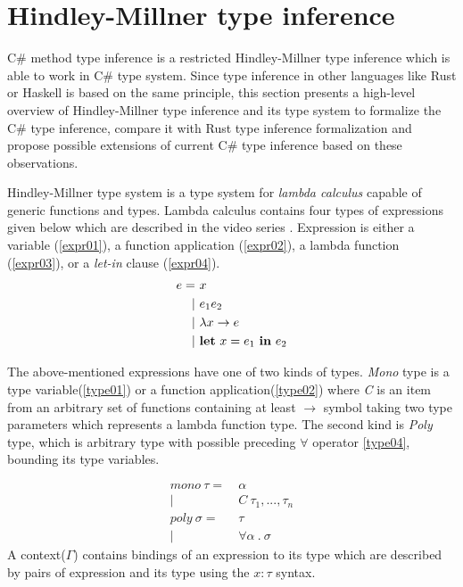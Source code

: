 \section{Hindley-Millner type inference}

C\# method type inference is a restricted Hindley-Millner type inference which is able to work in C\# type system.
Since type inference in other languages like Rust or Haskell is based on the same principle, this section presents a high-level overview of Hindley-Millner type inference and its type system to formalize the C\# type inference, compare it with Rust type inference formalization and propose possible extensions of current C\# type inference based on these observations.
\par
Hindley-Millner type system \cite{online:wikiHM} is a type system for \textit{lambda calculus} capable of generic functions and types.
Lambda calculus contains four types of expressions given below which are described in the video series \cite{online:HMVideos}.
Expression is either a variable (\ref{expr01}), a function application (\ref{expr02}), a lambda function (\ref{expr03}), or a \textit{let-in} clause (\ref{expr04}).
\begin{align}
e =&\ x\label{expr01}\\
|&\ e_1 e_2\label{expr02}\\
|&\ \lambda x \rightarrow e\label{expr03}\\
|&\ \text{\textbf{let}}\ x = e_1\ \text{\textbf{in}}\ e_2\label{expr04} 
\end{align}
\par
The above-mentioned expressions have one of two kinds of types.
\textit{Mono} type is a type variable(\ref{type01}) or a function application(\ref{type02}) where \textit{C} is an item from an arbitrary set of functions containing at least \texttt{$\rightarrow$} symbol taking two type parameters which represents a lambda function type.
The second kind is \textit{Poly} type, which is arbitrary type with possible preceding $\forall$ operator \ref{type04}, bounding its type variables.
\par
\begin{align}
mono\ \tau =&\ \alpha\label{type01}\\
|&\ C\ \tau_1,...,\tau_n\label{type02}\\
poly\ \sigma =&\ \tau\label{type03}\\
|&\ \forall \alpha\ .\ \sigma\label{type04}
\end{align}
A context(\texttt{$\Gamma$}) contains bindings of an expression to its type which are described by pairs of expression and its type using the \texttt{$x:\tau$} syntax.
